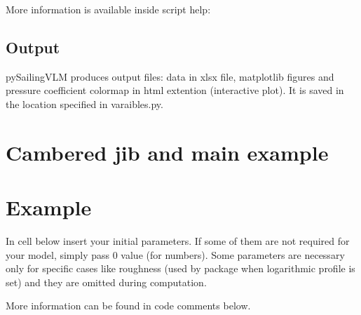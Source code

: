 \documentclass[letterpaper,10pt,english]{jupyterBook}
\begin{document}
\sphinxAtStartPar
More information is available inside script help:

\begin{sphinxVerbatim}[commandchars=\\\{\}]
 
\end{sphinxVerbatim}


\subsection{Output}
\label{\detokenize{chapters/usage/usage:output}}
\sphinxAtStartPar
pySailingVLM produces output files: data in xlsx file, matplotlib figures and pressure coefficient colormap in html extention (interactive plot). It is saved in the location specified in varaibles.py.

\sphinxstepscope


\section{Cambered jib and main example}
\label{\detokenize{chapters/examples/sailingvlm_example:cambered-jib-and-main-example}}\label{\detokenize{chapters/examples/sailingvlm_example::doc}}

\section{Example}
\label{\detokenize{chapters/examples/sailingvlm_example:example}}
\sphinxAtStartPar
In cell below insert your initial parameters. If some of them are not required for your model, simply pass 0 value (for numbers).
Some parameters are necessary only for specific cases like roughness (used by package when logarithmic profile is set) and they are omitted during computation.



\sphinxAtStartPar
More information can be found in code comments below.
\end{document}
